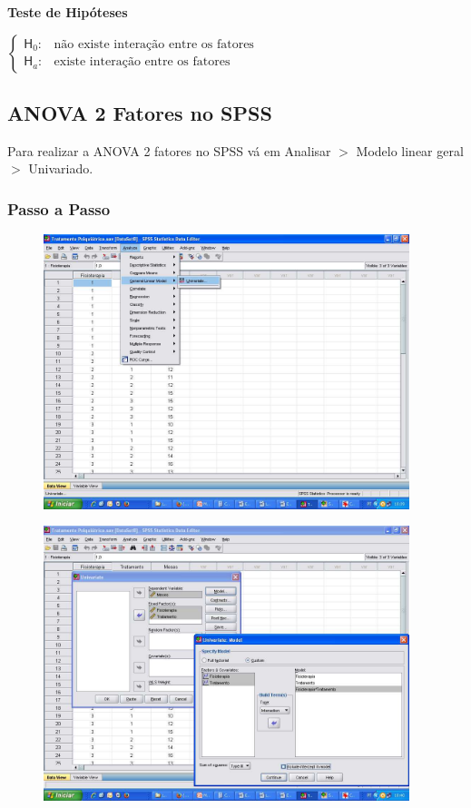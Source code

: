 		\bigskip

		\textbf{Teste de Hipóteses}

			\bigskip

			$
				\begin{cases}
					\mathsf{H}_{0} : & \text{não existe interação entre os fatores} \\
					\mathsf{H}_{a} : & \text{existe interação entre os fatores}
				\end{cases}
			$

	\subsection{ANOVA 2 Fatores no SPSS \cite{torres}}

		Para realizar a ANOVA 2 fatores no SPSS vá em Analisar $>$ Modelo linear geral $>$ Univariado.

		\subsubsection{Passo a Passo}

			\begin{figure}[H]
			
				\centering
				\includegraphics[height=8cm]{images/anova2_passo-a-passo_1}
			\end{figure}			
			
			\begin{figure}[H]
			
				\centering
				\includegraphics[height=8cm]{images/anova2_passo-a-passo_2}
			\end{figure}
			
